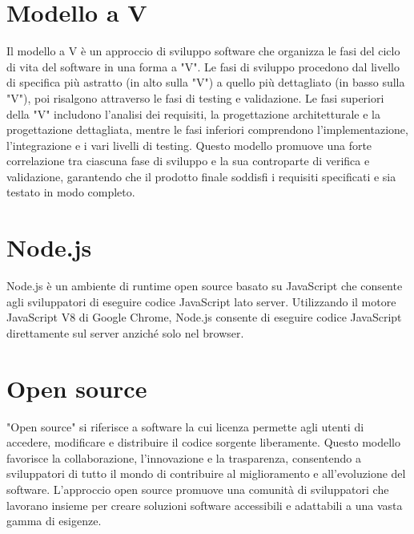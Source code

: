 \documentclass{article}
\begin{document}
\section{Modello a V}
Il modello a V è un approccio di sviluppo software che organizza le fasi del ciclo di vita del software in una forma a "V". Le fasi di sviluppo procedono dal livello di specifica più astratto (in alto sulla "V") a quello più dettagliato (in basso sulla "V"), poi risalgono attraverso le fasi di testing e validazione. Le fasi superiori della "V" includono l'analisi dei requisiti, la progettazione architetturale e la progettazione dettagliata, mentre le fasi inferiori comprendono l'implementazione, l'integrazione e i vari livelli di testing. Questo modello promuove una forte correlazione tra ciascuna fase di sviluppo e la sua controparte di verifica e validazione, garantendo che il prodotto finale soddisfi i requisiti specificati e sia testato in modo completo.

\section{Node.js}
Node.js è un ambiente di runtime open source basato su JavaScript che consente agli sviluppatori di eseguire codice JavaScript lato server. Utilizzando il motore JavaScript V8 di Google Chrome, Node.js consente di eseguire codice JavaScript direttamente sul server anziché solo nel browser.

\section{Open source}
"Open source" si riferisce a software la cui licenza permette agli utenti di accedere, modificare e distribuire il codice sorgente liberamente. Questo modello favorisce la collaborazione, l'innovazione e la trasparenza, consentendo a sviluppatori di tutto il mondo di contribuire al miglioramento e all'evoluzione del software. L'approccio open source promuove una comunità di sviluppatori che lavorano insieme per creare soluzioni software accessibili e adattabili a una vasta gamma di esigenze.
\end{document}
